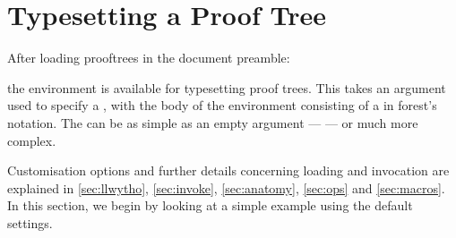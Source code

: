 \documentclass[10pt,british,a4paper,doc2]{ltxdoc}
\newcommand*\pkg[1]{\textsf{#1}}
\begin{document}
\section{Typesetting a Proof Tree}\label{sec:ee}

After loading \pkg{prooftrees} in the document preamble:
\begin{latexcode}
\usepackage{prooftrees}
\end{latexcode}
the  environment is available for typesetting proof trees.
This takes an argument used to specify a , with the body of the environment consisting of a  in \pkg{forest}'s notation.
The  can be as simple as an empty argument --- \arg{} --- or much more complex.

Customisation options and further details concerning loading and invocation are explained in \cref{sec:llwytho}, \cref{sec:invoke}, \cref{sec:anatomy}, \cref{sec:ops} and \cref{sec:macros}.
In this section, we begin by looking at a simple example using the default settings.
\end{document}
